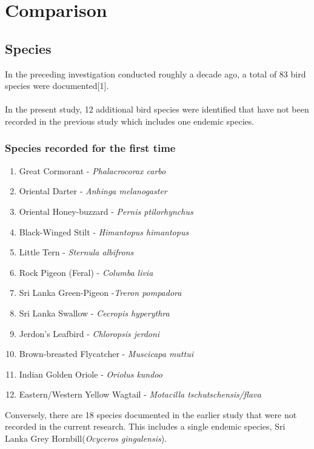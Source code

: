 \chapter{Comparison}
\label{cp:Comparative}
\section{Species}
In the preceding investigation conducted roughly a decade ago, a total of 83 bird species were documented[1]. 
\\\\
In the present study, 12 additional bird species were identified that have not been recorded in the previous study which includes one endemic species. 

\begin{importantbox}
\subsection{Species recorded for the first time}
\begin{enumerate}
    \item Great Cormorant - \textit{Phalacrocorax carbo}
    \item Oriental Darter - \textit{Anhinga melanogaster}
    \item Oriental Honey-buzzard - \textit{Pernis ptilorhynchus}
    \item Black-Winged Stilt - \textit{Himantopus himantopus}
    \item Little Tern - \textit{Sternula albifrons}
    \item Rock Pigeon (Feral) - \textit{Columba livia}
    \item Sri Lanka Green-Pigeon -\textit{Treron pompadora}
    \item Sri Lanka Swallow - \textit{Cecropis hyperythra}
    \item Jerdon's Leafbird - \textit{Chloropsis jerdoni}
    \item Brown-breasted Flycatcher - \textit{Muscicapa muttui}
    \item Indian Golden Oriole - \textit{Oriolus kundoo}
    \item Eastern/Western Yellow Wagtail - \textit{Motacilla tschutschensis/flava}
\end{enumerate}
\end{importantbox}

Conversely, there are 18 species documented in the earlier study that were not recorded in the current research. This includes a single endemic species, Sri Lanka Grey Hornbill(\textit{Ocyceros gingalensis}).
